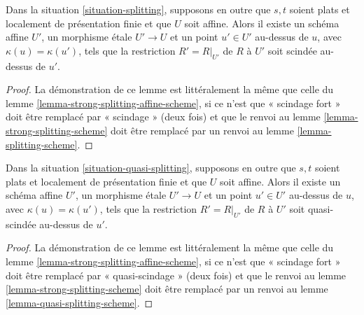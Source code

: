 \begin{lemma}
\label{lemma-splitting-affine-scheme}
Dans la situation \ref{situation-splitting}, supposons en outre que
$s, t$ soient plats et localement de présentation finie et que $U$ soit affine.
Alors il existe un schéma affine $U'$, un morphisme \'etale
$U' \to U$ et un point $u' \in U'$ au-dessus de $u$, avec
$\kappa(u) = \kappa(u')$, tels que la restriction $R' = R|_{U'}$ de
$R$ à $U'$ soit scindée au-dessus de $u'$.
\end{lemma}

\begin{proof}
La démonstration de ce lemme est littéralement la même que celle du
lemme \ref{lemma-strong-splitting-affine-scheme},
si ce n'est que « scindage fort » doit être remplacé par « scindage »
(deux fois) et que le renvoi au
lemme \ref{lemma-strong-splitting-scheme}
doit être remplacé par un renvoi au
lemme \ref{lemma-splitting-scheme}.
\end{proof}

\begin{lemma}
\label{lemma-quasi-splitting-affine-scheme}
Dans la situation \ref{situation-quasi-splitting}, supposons en outre que
$s, t$ soient plats et localement de présentation finie et que $U$ soit affine.
Alors il existe un schéma affine $U'$, un morphisme \'etale
$U' \to U$ et un point $u' \in U'$ au-dessus de $u$, avec
$\kappa(u) = \kappa(u')$, tels que la restriction $R' = R|_{U'}$ de
$R$ à $U'$ soit quasi-scindée au-dessus de $u'$.
\end{lemma}

\begin{proof}
La démonstration de ce lemme est littéralement la même que celle du
lemme \ref{lemma-strong-splitting-affine-scheme},
si ce n'est que « scindage fort » doit être remplacé par « quasi-scindage »
(deux fois) et que le renvoi au
lemme \ref{lemma-strong-splitting-scheme}
doit être remplacé par un renvoi au
lemme \ref{lemma-quasi-splitting-scheme}.
\end{proof}








